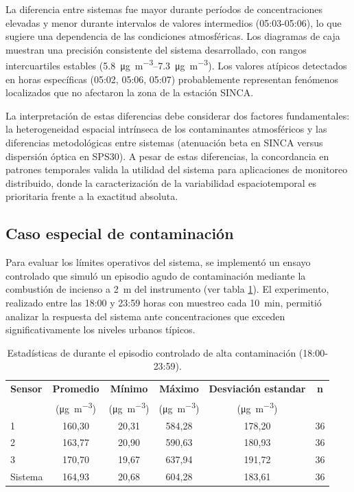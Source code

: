La diferencia entre sistemas fue mayor durante períodos de concentraciones elevadas y menor durante intervalos de valores intermedios (05:03-05:06), lo que sugiere una dependencia de las condiciones atmosféricas. Los diagramas de caja muestran una precisión consistente del sistema desarrollado, con rangos intercuartiles estables (\SIrange{5.8}{7.3}{\micro\gram\per\cubic\meter}). Los valores atípicos detectados en horas específicas (05:02, 05:06, 05:07) probablemente representan fenómenos localizados que no afectaron la zona de la estación SINCA.

La interpretación de estas diferencias debe considerar dos factores fundamentales: la heterogeneidad espacial intrínseca de los contaminantes atmosféricos y las diferencias metodológicas entre sistemas (atenuación beta en SINCA versus dispersión óptica en SPS30). A pesar de estas diferencias, la concordancia en patrones temporales valida la utilidad del sistema para aplicaciones de monitoreo distribuido, donde la caracterización de la variabilidad espaciotemporal es prioritaria frente a la exactitud absoluta.



\subsection{Caso especial de contaminación}

Para evaluar los límites operativos del sistema, se implementó un ensayo controlado que simuló un episodio agudo de contaminación mediante la combustión de incienso a \SI{2}{\meter} del instrumento (ver tabla \ref{tab:estadisticas_pico}). El experimento, realizado entre las 18:00 y 23:59 horas con muestreo cada \SI{10}{\minute}, permitió analizar la respuesta del sistema ante concentraciones que exceden significativamente los niveles urbanos típicos.



\begin{table}[htbp]
	\centering
	\caption{Estadísticas de \MPF durante el episodio controlado de alta contaminación (18:00-23:59).}
	\begin{tabular}{lccccc}
		\toprule
		\textbf{Sensor} & \textbf{Promedio} & \textbf{Mínimo} & \textbf{Máximo} &\textbf{Desviación estandar} & \textbf{n} \\
		& (\si{\micro\gram\per\cubic\meter}) & (\si{\micro\gram\per\cubic\meter}) & (\si{\micro\gram\per\cubic\meter}) & (\si{\micro\gram\per\cubic\meter}) & \\
		\midrule
		1 & 160,30 & 20,31 & 584,28 & 178,20 & 36 \\
		2 & 163,77 & 20,90 & 590,63 & 180,93 & 36 \\
		3 & 170,70 & 19,67 & 637,94 & 191,72 & 36 \\
		Sistema & 164,93 & 20,68 & 604,28 & 183,61 & 36 \\
		\bottomrule
	\end{tabular}
	\label{tab:estadisticas_pico}
\end{table}

